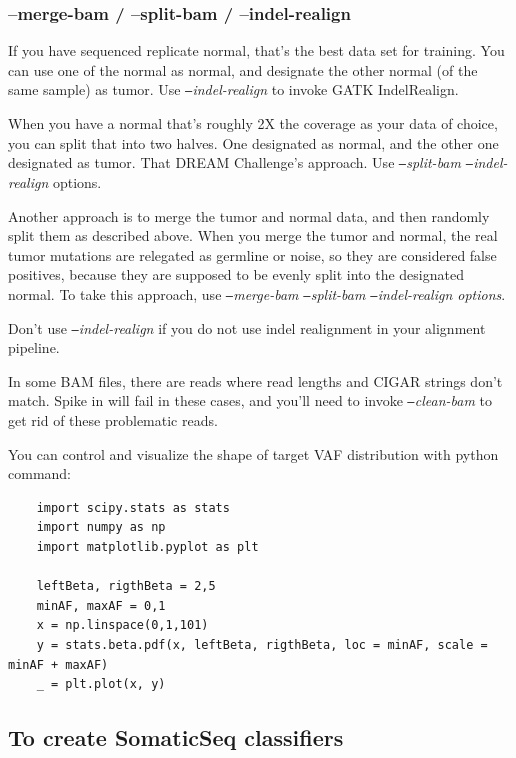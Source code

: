 \documentclass[10pt,letterpaper]{article}
\begin{document}
\begin{sloppypar}
\subsubsection{--merge-bam / --split-bam / --indel-realign}


If you have sequenced replicate normal, that's the best data set for training. You can use one of the normal as normal, and designate the other normal (of the same sample) as tumor. Use \textit{\texttt{--}indel-realign} to invoke GATK IndelRealign.

When you have a normal that's roughly 2X the coverage as your data of choice, you can split that into two halves. One designated as normal, and the other one designated as tumor. That DREAM Challenge's approach. Use \textit{\texttt{--}split-bam \texttt{--}indel-realign} options.

Another approach is to merge the tumor and normal data, and then randomly split them as described above. When you merge the tumor and normal, the real tumor mutations are relegated as germline or noise, so they are considered false positives, because they are supposed to be evenly split into the designated normal. To take this approach, use \textit{\texttt{--}merge-bam \texttt{--}split-bam \texttt{--}indel-realign options}.

Don't use \textit{\texttt{--}indel-realign} if you do not use indel realignment in your alignment pipeline.

In some BAM files, there are reads where read lengths and CIGAR strings don't match. Spike in will fail in these cases, and you'll need to invoke \textit{\texttt{--}clean-bam} to get rid of these problematic reads.

You can control and visualize the shape of target VAF distribution with python command:

\begin{lstlisting}
    import scipy.stats as stats
    import numpy as np
    import matplotlib.pyplot as plt

    leftBeta, rigthBeta = 2,5
    minAF, maxAF = 0,1
    x = np.linspace(0,1,101)
    y = stats.beta.pdf(x, leftBeta, rigthBeta, loc = minAF, scale = minAF + maxAF)
    _ = plt.plot(x, y)
\end{lstlisting}


\subsection{To create SomaticSeq classifiers}


\end{sloppypar}
\end{document}
